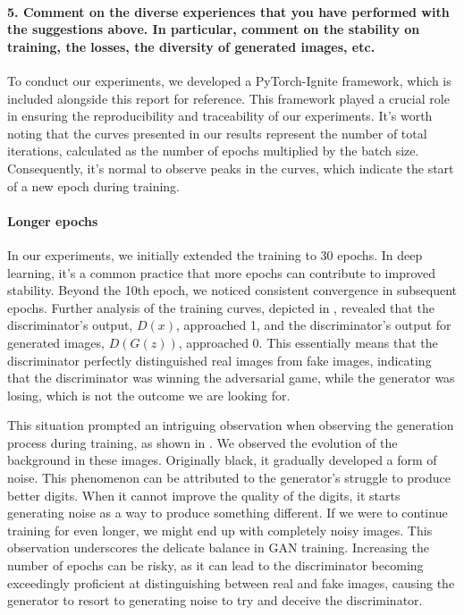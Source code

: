 \newpage
\paragraph*{5. Comment on the diverse experiences that you have performed with the suggestions above. In particular, comment on the stability on training, the losses, the diversity of generated images, etc.}

To conduct our experiments, we developed a PyTorch-Ignite framework, which is included alongside this report for reference. This framework played a crucial role in ensuring the reproducibility and traceability of our experiments. It's worth noting that the curves presented in our results represent the number of total iterations, calculated as the number of epochs multiplied by the batch size. Consequently, it's normal to observe peaks in the curves, which indicate the start of a new epoch during training.

\paragraph*{Longer epochs}
In our experiments, we initially extended the training to 30 epochs. In deep learning, it's a common practice that more epochs can contribute to improved stability. Beyond the 10th epoch, we noticed consistent convergence in subsequent epochs. Further analysis of the training curves, depicted in , revealed that the discriminator's output, $D(x)$, approached 1, and the discriminator's output for generated images, $D(G(z))$, approached 0. This essentially means that the discriminator perfectly distinguished real images from fake images, indicating that the discriminator was winning the adversarial game, while the generator was losing, which is not the outcome we are looking for.

This situation prompted an intriguing observation when observing the generation process during training, as shown in . We observed the evolution of the background in these images. Originally black, it gradually developed a form of noise. This phenomenon can be attributed to the generator's struggle to produce better digits. When it cannot improve the quality of the digits, it starts generating noise as a way to produce something different. If we were to continue training for even longer, we might end up with completely noisy images. This observation underscores the delicate balance in GAN training. Increasing the number of epochs can be risky, as it can lead to the discriminator becoming exceedingly proficient at distinguishing between real and fake images, causing the generator to resort to generating noise to try and deceive the discriminator.

